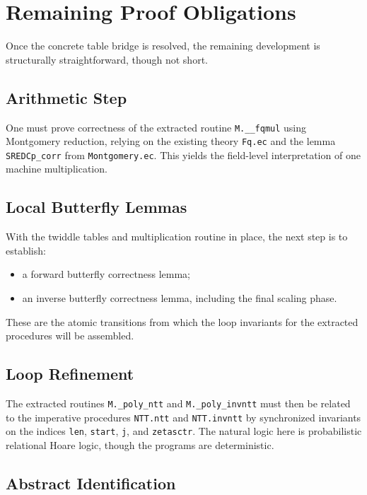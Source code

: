 \documentclass[11pt]{article}
\begin{document}
\section{Remaining Proof Obligations}

Once the concrete table bridge is resolved, the remaining development is
structurally straightforward, though not short.

\subsection{Arithmetic Step}

One must prove correctness of the extracted routine
\texttt{M.\_\_fqmul} using Montgomery reduction, relying on the
existing theory \texttt{Fq.ec} and the lemma \texttt{SREDCp\_corr} from
\texttt{Montgomery.ec}. This yields the field-level interpretation of one
machine multiplication.

\subsection{Local Butterfly Lemmas}

With the twiddle tables and multiplication routine in place, the next step is
to establish:
\begin{itemize}
\item a forward butterfly correctness lemma;
\item an inverse butterfly correctness lemma, including the final scaling
phase.
\end{itemize}

These are the atomic transitions from which the loop invariants for the
extracted procedures will be assembled.

\subsection{Loop Refinement}

The extracted routines \texttt{M.\_poly\_ntt} and \texttt{M.\_poly\_invntt}
must then be related to the imperative procedures \texttt{NTT.ntt} and
\texttt{NTT.invntt} by synchronized invariants on the indices
\texttt{len}, \texttt{start}, \texttt{j}, and \texttt{zetasctr}. The natural
logic here is probabilistic relational Hoare logic, though the programs are
deterministic.

\subsection{Abstract Identification}
\end{document}
